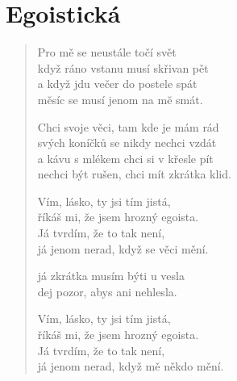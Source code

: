 \section{Egoistická}

\begin{verse}
Pro mě se neustále točí svět\\
když ráno vstanu musí skřivan pět\\
a když jdu večer do postele spát\\
měsíc se musí jenom na mě smát.

Chci svoje věci, tam kde je mám rád\\
svých koníčků se nikdy nechci vzdát\\
a kávu s mlékem chci si v křesle pít\\
nechci být rušen, chci mít zkrátka klid.

Vím, lásko, ty jsi tím jistá,\\
říkáš mi, že jsem hrozný egoista.\\
Já tvrdím, že to tak není,\\
já jenom nerad, když se věci mění.




já zkrátka musím býti u vesla\\
dej pozor, abys ani nehlesla.


Vím, lásko, ty jsi tím jistá,\\
říkáš mi, že jsem hrozný egoista.\\
Já tvrdím, že to tak není,\\
já jenom nerad, když mě někdo mění.


\end{verse}
